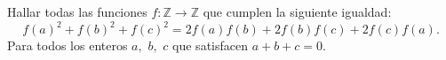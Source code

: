 Hallar todas las funciones $f : \mathbb{Z} \to \mathbb{Z}$ que cumplen la siguiente igualdad:
\[f(a)^2+f(b)^2+f(c)^2=2f(a)f(b)+2f(b)f(c)+2f(c)f(a).\]
Para todos los enteros $a,$ $b,$ $c$ que satisfacen $a+b+c=0$.